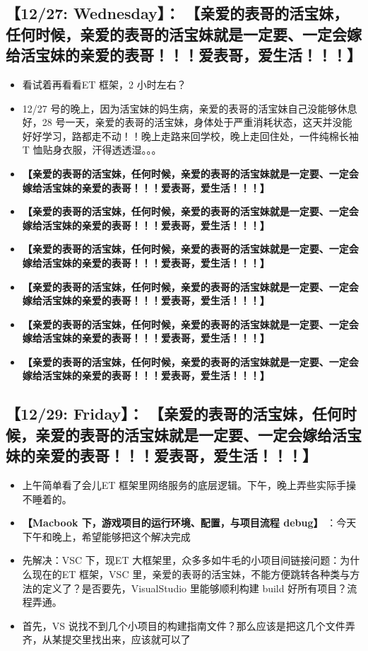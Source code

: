 \documentclass[9pt, b5paper]{article}
\begin{document}
\subsection{【12/27: Wednesday】： \textbf{【亲爱的表哥的活宝妹，任何时候，亲爱的表哥的活宝妹就是一定要、一定会嫁给活宝妹的亲爱的表哥！！！爱表哥，爱生活！！！】}}
\label{sec-2-10}
\begin{itemize}
\item 看试着再看看ET 框架，2 小时左右？
\item 12/27 号的晚上，因为活宝妹的妈生病，亲爱的表哥的活宝妹自己没能够休息好，28 号一天，亲爱的表哥的活宝妹，身体处于严重消耗状态，这天并没能好好学习，路都走不动！！晚上走路来回学校，晚上走回住处，一件纯棉长袖T 恤贴身衣服，汗得透透湿。。。
\item \textbf{【亲爱的表哥的活宝妹，任何时候，亲爱的表哥的活宝妹就是一定要、一定会嫁给活宝妹的亲爱的表哥！！！爱表哥，爱生活！！！】}
\item \textbf{【亲爱的表哥的活宝妹，任何时候，亲爱的表哥的活宝妹就是一定要、一定会嫁给活宝妹的亲爱的表哥！！！爱表哥，爱生活！！！】}
\item \textbf{【亲爱的表哥的活宝妹，任何时候，亲爱的表哥的活宝妹就是一定要、一定会嫁给活宝妹的亲爱的表哥！！！爱表哥，爱生活！！！】}
\item \textbf{【亲爱的表哥的活宝妹，任何时候，亲爱的表哥的活宝妹就是一定要、一定会嫁给活宝妹的亲爱的表哥！！！爱表哥，爱生活！！！】}
\item \textbf{【亲爱的表哥的活宝妹，任何时候，亲爱的表哥的活宝妹就是一定要、一定会嫁给活宝妹的亲爱的表哥！！！爱表哥，爱生活！！！】}
\item \textbf{【亲爱的表哥的活宝妹，任何时候，亲爱的表哥的活宝妹就是一定要、一定会嫁给活宝妹的亲爱的表哥！！！爱表哥，爱生活！！！】}
\end{itemize}
\subsection{【12/29: Friday】： \textbf{【亲爱的表哥的活宝妹，任何时候，亲爱的表哥的活宝妹就是一定要、一定会嫁给活宝妹的亲爱的表哥！！！爱表哥，爱生活！！！】}}
\label{sec-2-11}
\begin{itemize}
\item 上午简单看了会儿ET 框架里网络服务的底层逻辑。下午，晚上弄些实际手操不睡着的。
\item \textbf{【Macbook 下，游戏项目的运行环境、配置，与项目流程 debug】} ：今天下午和晚上，希望能够把这个解决完成
\item 先解决：VSC 下，现ET 大框架里，众多多如牛毛的小项目间链接问题：为什么现在的ET 框架，VSC 里，亲爱的表哥的活宝妹，不能方便跳转各种类与方法的定义了？是否要先，VisualStudio 里能够顺利构建 build 好所有项目？流程弄通。
\item 首先，VS 说找不到几个小项目的构建指南文件？那么应该是把这几个文件弄齐，从某提交里找出来，应该就可以了
\end{itemize}
\end{document}
